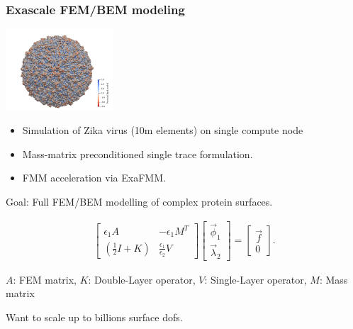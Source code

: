 \documentclass[dvipsnames,10pt]{beamer}
\begin{document}
\begin{frame}
\frametitle{Exascale FEM/BEM modeling}

\vspace{\baselineskip}

\begin{minipage}{5cm}
    \begin{center}
        \includegraphics[width=4cm]{../figs/6CO8_potential.png}
    \end{center}
\end{minipage}
\begin{minipage}{5cm}
\small
\begin{itemize}
\item Simulation of Zika virus (10m elements) on single compute node\footnotemark
\item Mass-matrix preconditioned single trace formulation.
\item FMM acceleration via ExaFMM.
\end{itemize}
\end{minipage}

\vspace{\baselineskip}

Goal: Full FEM/BEM modelling of complex protein surfaces.

\begin{align*}
\begin{bmatrix}
\epsilon_1 A &  - \epsilon_1 M^T \\
\left(\tfrac12 I + K \right) &  \tfrac{\epsilon_1}{\epsilon_2} V
\end{bmatrix}
\begin{bmatrix}
\vec{\phi}_1 \\
\vec{\lambda}_2
\end{bmatrix}
=
\begin{bmatrix}
\vec{f} \\
0
\end{bmatrix}.
\end{align*}

$A$: FEM matrix, $K$: Double-Layer operator, $V$: Single-Layer operator, $M$: Mass matrix

\begin{tcolorbox}
Want to scale up to billions surface dofs.
\end{tcolorbox}

\end{frame}
\end{document}
